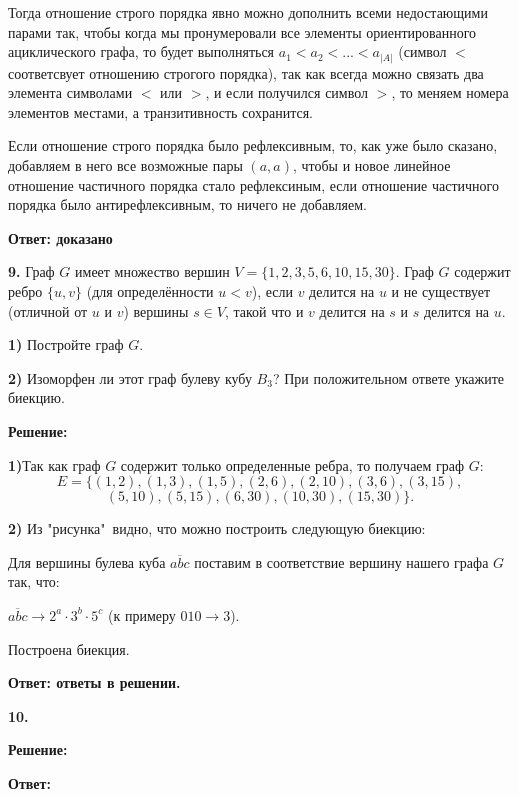 \documentclass[a4paper,12pt]{article} %
\begin{document}
Тогда отношение строго порядка явно можно дополнить всеми недостающими парами так, чтобы когда мы пронумеровали все элементы ориентированного ациклического графа, то будет выполняться $a_1 < a_2 < ... < a_{|A|}$ (символ $<$ соответсвует отношению строгого порядка), так как всегда можно связать два элемента символами $<$ или $>$, и если получился символ $>$, то меняем номера элементов местами, а транзитивность сохранится.

Если отношение строго порядка было рефлексивным, то, как уже было сказано, добавляем в него все возможные пары $(a,a)$, чтобы и новое линейное отношение частичного порядка стало рефлексиным, если отношение частичного порядка было антирефлексивным, то ничего не добавляем.


\begin{flushright}
\begin{large}
\textbf {Ответ: доказано}
\end{large}
\end{flushright}

{\bf 9.} Граф $G$ имеет множество вершин $V  =\{ 1,2,3,5,6,10,15,30 \} $. Граф $G$ содержит ребро $\{u, v \}$ (для определённости $u < v$), если $v$ делится на $u$ и не существует (отличной от $u$ и $v$) вершины $s \in V$, такой что и $v$ делится на $s$ и $s$ делится на $u$.

{\bf 1)} Постройте граф $G$.

{\bf 2)} Изоморфен ли этот граф булеву кубу $B_3$? При положительном ответе укажите биекцию.
\begin{center}
\bfseries
{\Large Решение: }
\end{center}

{\bf 1)}Так как граф $G$ содержит только определенные ребра, то получаем граф $G :$
\[E = \{ (1,2), (1,3), (1,5),(2,6), (2,10),(3,6),(3,15),\]
\[(5,10), (5,15), (6,30), (10,30), (15,30)\} .\]

{\bf 2)} Из "рисунка"\  видно, что можно построить следующую биекцию:

Для вершины булева куба $\overline{abc}$ поставим в соответствие вершину нашего графа $G$ так, что:

$\overline{abc} \rightarrow 2^a\cdot 3^b\cdot 5^c$ (к примеру $010 \rightarrow 3$).

Построена биекция.



\begin{flushright}
\begin{large}
\textbf {Ответ: ответы в решении.}
\end{large}
\end{flushright}

{\bf 10.} 
\begin{center}
\bfseries
{\Large Решение: }
\end{center}

\begin{flushright}
\begin{large}
\textbf {Ответ: }
\end{large}
\end{flushright}
\end{document}
